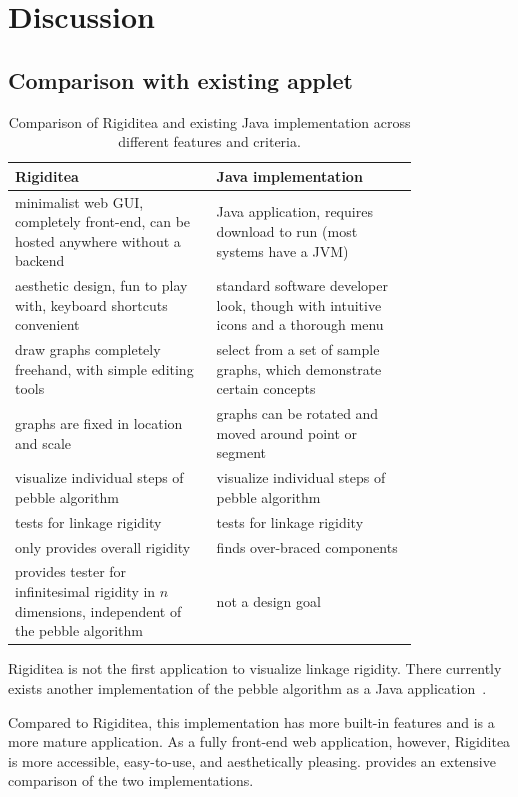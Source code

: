 \documentclass[aps,prd,final,twocolumn,letterpaper,nofootinbib]{revtex4-1}
\begin{document}
\section{Discussion}
\label{sec:discuss}

\subsection{Comparison with existing applet}


\begin{table}[ht]
\def\arraystretch{1.5}
\caption{Comparison of Rigiditea and existing Java implementation
across different features and criteria.}
\begin{tabular}{p{0.4\linewidth} | p{0.4\linewidth}}
Rigiditea & Java implementation \\ \hline
minimalist web GUI, completely front-end, can be hosted anywhere
without a backend &
Java application, requires download to run (most systems have a JVM) \\
aesthetic design, fun to play with, keyboard shortcuts convenient &
standard software developer look, though with intuitive icons
and a thorough menu\\
draw graphs completely freehand,
with simple editing tools &
select from a set of sample graphs,
which demonstrate certain concepts \\
graphs are fixed in location and scale &
graphs can be rotated and moved around point or segment \\
visualize individual steps of pebble algorithm &
visualize individual steps of pebble algorithm\\
tests for linkage rigidity & tests for linkage rigidity\\
only provides overall rigidity & finds over-braced components \\
provides tester for infinitesimal rigidity in $n$ dimensions,
independent of the pebble algorithm
& not a design goal
\end{tabular}
\label{tab:comp}
\end{table}


Rigiditea is not the first application to visualize linkage rigidity.
There currently exists another
implementation of the pebble algorithm as a Java application~\cite{stjohnapplet}.

Compared to Rigiditea, this implementation
has more built-in features and is a more mature application.
As a fully front-end web application, however,
Rigiditea is more accessible, easy-to-use, and aesthetically pleasing.
 provides an extensive comparison of the two implementations.
\end{document}
